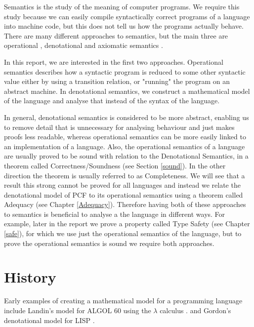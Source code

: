 Semantics is the study of the meaning of computer programs. We require this study because we can easily compile syntactically correct programs  of a language into machine code, but this does not tell us how the programs actually behave. There are many different approaches to semantics, but the main three are operational \citep{Plotkin81}, denotational \citep{Scott93} and axiomatic semantics \citep{Hoare69}.

In this report, we are interested in the first two approaches. Operational semantics describes how a syntactic program is reduced to some other syntactic value either by using a transition relation, or "running" the program on an abstract machine. In denotational semantics, we construct a mathematical model of the language and analyse that instead of the syntax of the language.

In general, denotational semantics is considered to be more abstract, enabling us to remove detail that is unnecessary for analysing behaviour and just makes proofs less readable,  whereas operational semantics can be more easily linked to an implementation of a language. Also, the operational semantics of a language are usually proved to be sound with relation to the Denotational Semantics, in a theorem called Correctness/Soundness (see Section \ref{sound}). In the other direction the theorem is usually referred to as Completeness. We will see that a result this strong cannot be proved for all languages and instead we relate the denotational model of PCF to its operational semantics using a theorem called Adequacy (see Chapter \ref{Adequacy}). Therefore having both of these approaches to semantics is beneficial to analyse a the language in different ways. For example, later in the report we prove a property called Type Safety (see Chapter \ref{safe}), for which we use just the operational semantics of the language, but to prove the operational semantics is sound we require both approaches.

\section{History}
Early examples of creating a mathematical model for a programming language include Landin's model for ALGOL 60 using the $\lambda$ calculus \citep{Landin64,Landin65}.
and Gordon's denotational model for LISP \citep{Gordon73}.


